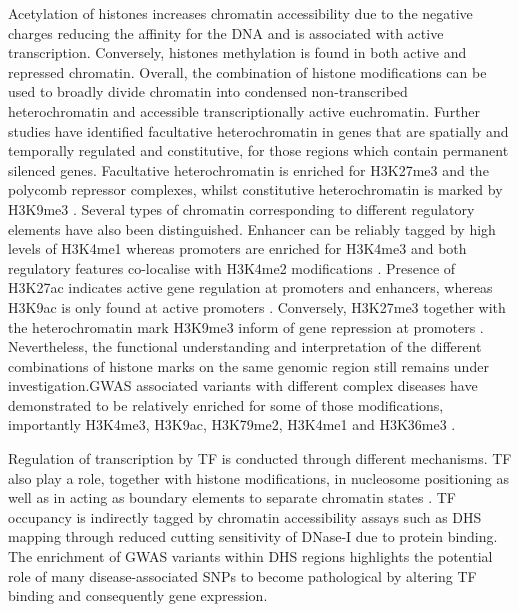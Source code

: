 Acetylation of histones increases chromatin accessibility due to the negative charges reducing the affinity for the DNA and is associated with active transcription. Conversely, histones methylation is found in both active and repressed chromatin. Overall, the combination of histone modifications can be used to broadly divide chromatin into condensed non-transcribed heterochromatin and accessible transcriptionally active euchromatin. Further studies have identified facultative heterochromatin in genes that are spatially and temporally regulated and constitutive, for those regions which contain permanent silenced genes. Facultative heterochromatin is enriched for H3K27me3 and the polycomb repressor complexes, whilst constitutive heterochromatin is marked by H3K9me3 \parencite{Hansen2008,Bannister2001}. Several types of chromatin corresponding to different regulatory elements have also been distinguished. Enhancer can be reliably tagged by high levels of H3K4me1 whereas promoters are enriched for H3K4me3 and both regulatory features co-localise with H3K4me2 modifications \parencite{Heintzman2007,Hon2009}. Presence of H3K27ac indicates active gene regulation at promoters and enhancers, whereas H3K9ac is only found at active promoters \parencite{Hon2009,Creyghton2010}. Conversely, H3K27me3 together with the heterochromatin mark H3K9me3 inform of gene repression at promoters \parencite{Hansen2008,Bannister2001,Pan2007}. Nevertheless, the functional understanding and interpretation of the different combinations of histone marks on the same genomic region still remains under investigation.GWAS associated variants with different complex diseases have demonstrated to be relatively enriched for some of those modifications, importantly H3K4me3, H3K9ac, H3K79me2, H3K4me1 and H3K36me3 \parencite{Ernst2011, Trynka2013}. 

Regulation of transcription by TF is conducted through different mechanisms.
TF also play a role, together with histone modifications, in nucleosome positioning as well as in acting as boundary elements to separate chromatin states \parencite{Vierstra2014,Zhang2009,Bell2000}. TF occupancy is indirectly tagged by chromatin accessibility assays such as DHS mapping through reduced cutting sensitivity of DNase-I due to protein binding. The enrichment of GWAS variants within DHS regions highlights the potential role of many disease-associated SNPs to become pathological by altering TF binding and consequently gene expression.




